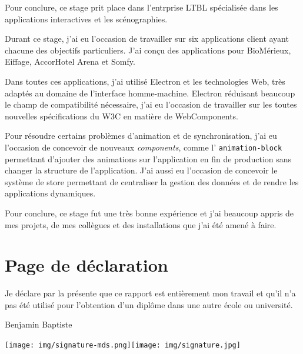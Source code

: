 \documentclass{article}
\newcommand{\components}{\emph{components}\xspace}
\newcommand{\aha}{AccorHotel Arena\xspace}
\begin{document}
    Pour conclure, ce stage prit place dans l'entrprise LTBL spécialisée dans les applications interactives et les scénographies.

    Durant ce stage, j'ai eu l'occasion de travailler sur six applications client ayant chacune des objectifs particuliers.
    J'ai conçu des applications pour BioMérieux, Eiffage, \aha et Somfy.

    Dans toutes ces applications, j'ai utilisé Electron et les technologies Web, très adaptés au domaine de l'interface homme-machine.
    Electron réduisant beaucoup le champ de compatibilité nécessaire, j'ai eu l'occasion de travailler sur les toutes nouvelles spécifications du W3C en matière de WebComponents.

    Pour résoudre certains problèmes d'animation et de synchronisation, j'ai eu l'occasion de concevoir de nouveaux \components, comme l’ \texttt{animation-block} permettant d'ajouter des animations sur l'application en fin de production sans changer la structure de l'application.
    J'ai aussi eu l'occasion de concevoir le système de store permettant de centraliser la gestion des données et de rendre les applications dynamiques.

    Pour conclure, ce stage fut une très bonne expérience et j'ai beaucoup appris de mes projets, de mes collègues et des installations que j'ai été amené à faire.

    \clearpage

    \section{Page de déclaration}

    \vspace{\fill}

    Je déclare par la présente que ce rapport est entièrement mon travail et qu'il n'a pas été utilisé pour l'obtention d'un diplôme dans une autre école ou université.

    \vspace{3cm}

    Benjamin \hspace{\fill}Baptiste 

    \texttt{[image: img/signature-mds.png]}\hspace{\fill}\texttt{[image: img/signature.jpg]}

    \vspace{\fill}
\end{document}
